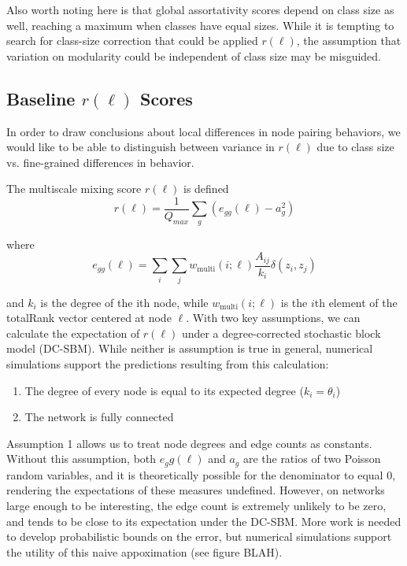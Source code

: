 \documentclass[12pt]{article}
\begin{document}
Also worth noting here is that global assortativity scores depend on class size as well, reaching a maximum when classes have equal sizes.  While it is tempting to search for class-size correction that could be applied $r(\ell)$, the assumption that variation on modularity could be independent of class size may be misguided.  

\subsection{Baseline $r(\ell)$ Scores}

In order to draw conclusions about local differences in node pairing behaviors, we would like to be able to distinguish between variance in $r(\ell)$ due to class size vs. fine-grained differences in behavior.  

The multiscale mixing score $r(\ell)$ is defined
\begin{equation}
  r(\ell) = \frac{1}{Q_{max}} \sum_g (e_{gg}(\ell) - a_g^2)
\end{equation}

where 
\begin{equation}
  e_{gg}(\ell) = \sum_i \sum_j w_{\text{multi}}(i; \ell) \frac{A_{ij}}{k_i} \delta(z_i, z_j) 
\end{equation}

and $k_i$ is the degree of the ith node, while $w_{\text{multi}}(i; \ell)$ is the $i$th element of the totalRank vector centered at node $\ell$.  With two key assumptions, we can calculate the expectation of $r(\ell)$ under a degree-corrected stochastic block model (DC-SBM).  While neither is assumption is true in general, numerical simulations support the predictions resulting from this calculation:

\begin{enumerate}
  \item The degree of every node is equal to its expected degree ($k_i = \theta_i$)
  \item The network is fully connected
\end{enumerate}

Assumption 1 allows us to treat node degrees and edge counts as constants.  Without this assumption, both $e_gg(\ell)$ and $a_g$ are the ratios of two Poisson random variables, and it is theoretically possible for the denominator to equal 0, rendering the expectations of these measures undefined.  However, on networks large enough to be interesting, the edge count is extremely unlikely to be zero, and tends to be close to its expectation under the DC-SBM.  More work is needed to develop probabilistic bounds on the error, but numerical simulations support the utility of this naive appoximation (see figure BLAH).    
\end{document}
